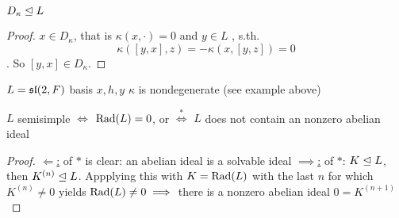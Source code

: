 
\begin{corollary}
    $D_\kappa \ideal L$
\end{corollary}
\begin{proof}
    $x \in D_\kappa$, that is $\kappa(x, \cdot) = 0$ and $y \in L$ , s.th.
    $$ \kappa([y,x],z)= - \kappa(x, [y,z]) = 0$$. So $[y,x] \in D_\kappa$.
\end{proof}

\begin{example}
    $L = \sl(2, F)$ basis $x,h,y$
    $\kappa$ is nondegenerate (see example above)
\end{example}

\begin{remark}
    $L$ semisimple $\iff$ $\Rad(L) = 0$, or 
    $\stackrel{\ast}{\iff}$ $L$ does not contain an nonzero abelian ideal
\end{remark}
\begin{proof}
    \underline{$\Leftarrow$:} of $\ast$ is clear: an abelian ideal is a solvable ideal
    \underline{$\implies$:} of $\ast$: $K \ideal L$, then $K^{(n)} \ideal L$. Appplying this with $K = \Rad(L)$ with the last
    $n$ for which $K^{(n)} \neq 0$ yields $\Rad(L) \neq 0 \implies$ there is a nonzero abelian ideal $0 = K^{(n+1)}$
\end{proof}


